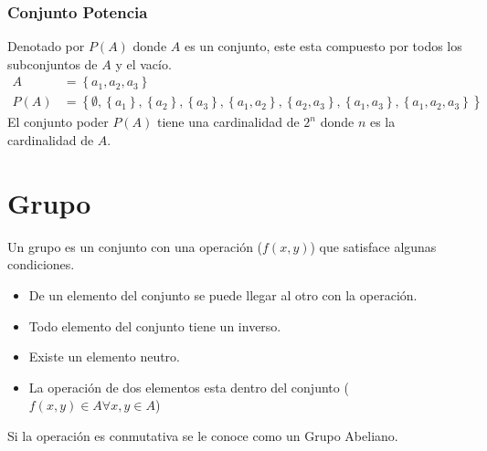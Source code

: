 \documentclass{report}
\begin{document}
\subsubsection{Conjunto Potencia}
Denotado por $P(A)$ donde $A$ es un conjunto, este esta compuesto por todos los subconjuntos de $A$ y el vacío.
\begin{align} 
	A &= \left\{a_1, a_2, a_3\right\}\\
	P(A) &= \left\{\emptyset,
\left\{a_1\right\},
\left\{a_2\right\},
\left\{a_3\right\},
\left\{a_1,a_2\right\},
\left\{a_2,a_3\right\},
\left\{a_1, a_3\right\},
\left\{a_1, a_2, a_3\right\}
\right\}
\end{align}
El conjunto poder $P(A)$ tiene una cardinalidad de $2^n$ donde $n$ es la cardinalidad de $A$.

\section{Grupo}
Un grupo es un conjunto con una operación ($f(x,y)$) que satisface algunas condiciones.
\begin{itemize}
\item De un elemento del conjunto se puede llegar al otro con la operación.
\item Todo elemento del conjunto tiene un inverso.
\item Existe un elemento neutro.
\item La operación de dos elementos esta dentro del conjunto ($f(x,y) \in A \forall x,y \in A$)
\end{itemize}
Si la operación es conmutativa se le conoce como un Grupo Abeliano.
\end{document}
